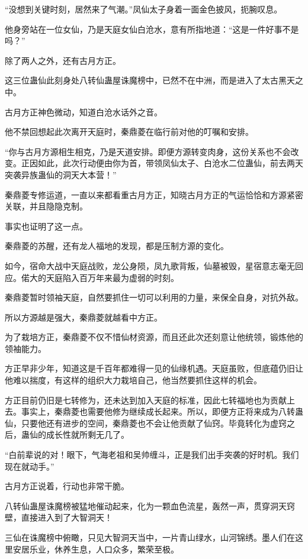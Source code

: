 
\begin{this_body}

“没想到关键时刻，居然来了气潮。”凤仙太子身着一面金色披风，扼腕叹息。

他身旁站在一位女仙，乃是天庭女仙白沧水，意有所指地道：“这是一件好事不是吗？”

除了两人之外，还有古月方正。

这三位蛊仙此刻身处八转仙蛊屋诛魔榜中，已然不在中洲，而是进入了太古黑天之中。

古月方正神色微动，知道白沧水话外之音。

他不禁回想起此次离开天庭时，秦鼎菱在临行前对他的叮嘱和安排。

“你与古月方源相生相克，乃是天道安排。即便方源转变肉身，这份关系也不会改变。正因如此，此次行动便由你为首，带领凤仙太子、白沧水二位蛊仙，前去两天突袭异族蛊仙的洞天大本营！”

秦鼎菱专修运道，一直以来都看重古月方正，知晓古月方正的气运恰恰和方源紧密关联，并且隐隐克制。

事实也证明了这一点。

秦鼎菱的苏醒，还有龙人福地的发现，都是压制方源的变化。

如今，宿命大战中天庭战败，龙公身陨，凤九歌背叛，仙墓被毁，星宿意志毫无回应。偌大的天庭陷入百万年来最为虚弱的时刻。

秦鼎菱暂时领袖天庭，自然要抓住一切可以利用的力量，来保全自身，对抗外敌。

所以方源越是强大，秦鼎菱就越看中方正。

为了栽培方正，秦鼎菱不仅不惜仙材资源，而且还此次还刻意让他统领，锻炼他的领袖能力。

方正早非少年，知道这是千百年都难得一见的仙缘机遇。天庭虽败，但底蕴仍旧让他难以揣度，有这样的组织大力栽培自己，他当然要抓住这样的机会。

方正目前仍旧是七转修为，还未达到加入天庭的标准，因此七转福地也为贡献上去。事实上，秦鼎菱也需要他修为继续成长起来。所以，即便方正将来成为八转蛊仙，只要他还有进步的空间，秦鼎菱也不会让他贡献了仙窍。毕竟转化为虚窍之后，蛊仙的成长性就所剩无几了。

“白前辈说的对！眼下，气海老祖和吴帅缠斗，正是我们出手突袭的好时机。我们现在就动手。”

古月方正说着，行动也非常干脆。

八转仙蛊屋诛魔榜被猛地催动起来，化为一颗血色流星，轰然一声，贯穿洞天窍壁，直接进入到了大智洞天！

三仙在诛魔榜中俯瞰，只见大智洞天当中，一片青山绿水，山河锦绣。墨人们在这里安居乐业，休养生息，人口众多，繁荣至极。


\end{this_body}
